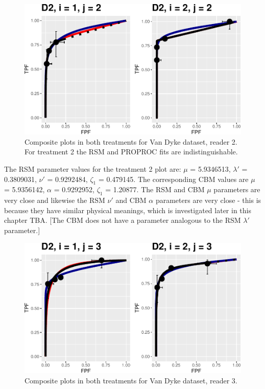 \documentclass[
]{book}
\begin{document}
\begin{figure}
\centering
\includegraphics{10-rsm-3-fits_files/figure-latex/rsm-3-fits-plots-1-2-1.pdf}
\caption{\label{fig:rsm-3-fits-plots-1-2}Composite plots in both treatments for Van Dyke dataset, reader 2. For treatment 2 the RSM and PROPROC fits are indistinguishable.}
\end{figure}

The RSM parameter values for the treatment 2 plot are: \(\mu\) = 5.9346513, \(\lambda'\) = 0.3809031, \(\nu'\) = 0.9292484, \(\zeta_1\) = 0.479145. The corresponding CBM values are \(\mu\) = 5.9356142, \(\alpha\) = 0.9292952, \(\zeta_1\) = 1.20877. The RSM and CBM \(\mu\) parameters are very close and likewise the RSM \(\nu'\) and CBM \(\alpha\) parameters are very close - this is because they have similar physical meanings, which is investigated later in this chapter TBA. {[}The CBM does not have a parameter analogous to the RSM \(\lambda'\) parameter.{]}

\begin{figure}
\centering
\includegraphics{10-rsm-3-fits_files/figure-latex/rsm-3-fits-plots-1-3-1.pdf}
\caption{\label{fig:rsm-3-fits-plots-1-3}Composite plots in both treatments for Van Dyke dataset, reader 3.}
\end{figure}
\end{document}
